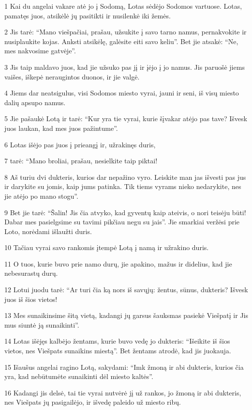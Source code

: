 \par 1 Kai du angelai vakare atė jo į Sodomą, Lotas sėdėjo Sodomos vartuose. Lotas, pamatęs juos, atsikėlė jų pasitikti ir nusilenkė iki žemės. 
\par 2 Jis tarė: “Mano viešpačiai, prašau, užsukite į savo tarno namus, pernakvokite ir nusiplaukite kojas. Anksti atsikėlę, galėsite eiti savo keliu”. Bet jie atsakė: “Ne, mes nakvosime gatvėje”. 
\par 3 Jis taip maldavo juos, kad jie užsuko pas jį ir įėjo į jo namus. Jis paruošė jiems vaišes, iškepė neraugintos duonos, ir jie valgė. 
\par 4 Jiems dar neatsigulus, visi Sodomos miesto vyrai, jauni ir seni, iš visų miesto dalių apsupo namus. 
\par 5 Jie pašaukė Lotą ir tarė: “Kur yra tie vyrai, kurie šįvakar atėjo pas tave? Išvesk juos laukan, kad mes juos pažintume”. 
\par 6 Lotas išėjo pas juos į prieangį ir, užrakinęs duris, 
\par 7 tarė: “Mano broliai, prašau, nesielkite taip piktai! 
\par 8 Aš turiu dvi dukteris, kurios dar nepažino vyro. Leiskite man jas išvesti pas jus ir darykite su jomis, kaip jums patinka. Tik tiems vyrams nieko nedarykite, nes jie atėjo po mano stogu”. 
\par 9 Bet jie tarė: “Šalin! Jis čia atvyko, kad gyventų kaip ateivis, o nori teisėju būti! Dabar mes pasielgsime su tavimi pikčiau negu su jais”. Jie smarkiai veržėsi prie Loto, norėdami išlaužti duris. 
\par 10 Tačiau vyrai savo rankomis įtempė Lotą į namą ir užrakino duris. 
\par 11 O tuos, kurie buvo prie namo durų, jie apakino, mažus ir didelius, kad jie nebesurastų durų. 
\par 12 Lotui juodu tarė: “Ar turi čia ką nors iš savųjų: žentus, sūnus, dukteris? Išvesk juos iš šios vietos! 
\par 13 Mes sunaikinsime šitą vietą, kadangi jų garsus šauksmas pasiekė Viešpatį ir Jis mus siuntė ją sunaikinti”. 
\par 14 Lotas išėjęs kalbėjo žentams, kurie buvo vedę jo dukteris: “Išeikite iš šios vietos, nes Viešpats sunaikins miestą”. Bet žentams atrodė, kad jis juokauja. 
\par 15 Išaušus angelai ragino Lotą, sakydami: “Imk žmoną ir abi dukteris, kurios čia yra, kad nebūtumėte sunaikinti dėl miesto kaltės”. 
\par 16 Kadangi jis delsė, tai tie vyrai nutvėrė jį už rankos, jo žmoną ir abi dukteris, nes Viešpats jų pasigailėjo, ir išvedę paleido už miesto ribų. 
